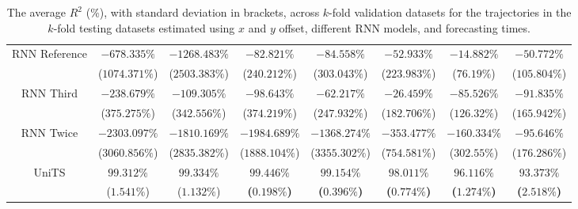 \begin{table}[!ht]
{\begin{tabular}{|c|c|c|c|c|c|c|c|}
			\multirow{2}{*}{RNN Reference} & $-678.335\%$ & $-1268.483\%$ & $-82.821\%$ & $-84.558\%$ & $-52.933\%$ & $-14.882\%$ & $-50.772\%$ \\
			 & ($1074.371\%$) & ($2503.383\%$) & ($240.212\%$) & ($303.043\%$) & ($223.983\%$) & ($76.19\%$) & ($105.804\%$) \\ \hline
			\multirow{2}{*}{RNN Third} & $-238.679\%$ & $-109.305\%$ & $-98.643\%$ & $-62.217\%$ & $-26.459\%$ & $-85.526\%$ & $-91.835\%$ \\
			 & ($375.275\%$) & ($342.556\%$) & ($374.219\%$) & ($247.932\%$) & ($182.706\%$) & ($126.32\%$) & ($165.942\%$) \\ \hline
			\multirow{2}{*}{RNN Twice} & $-2303.097\%$ & $-1810.169\%$ & $-1984.689\%$ & $-1368.274\%$ & $-353.477\%$ & $-160.334\%$ & $-95.646\%$ \\
			 & ($3060.856\%$) & ($2835.382\%$) & ($1888.104\%$) & ($3355.302\%$) & ($754.581\%$) & ($302.55\%$) & ($176.286\%$) \\ \hline
			\multirow{2}{*}{UniTS} & $99.312\%$ & $99.334\%$ & $\mathbf{99.446\%}$ & $\mathbf{99.154\%}$ & $\mathbf{98.011\%}$ & $\mathbf{96.116\%}$ & $\mathbf{93.373\%}$ \\
			 & ($1.541\%$) & ($1.132\%$) & \textbf{(}$\mathbf{0.198\%}$\textbf{)} & \textbf{(}$\mathbf{0.396\%}$\textbf{)} & \textbf{(}$\mathbf{0.774\%}$\textbf{)} & \textbf{(}$\mathbf{1.274\%}$\textbf{)} & \textbf{(}$\mathbf{2.518\%}$\textbf{)} \\ \hline
		\end{tabular}
	}
	\caption{The average $R^{2}$ (\%), with standard deviation in brackets, across $k$-fold validation datasets for the trajectories in the $k$-fold testing datasets estimated using $x$ and $y$ offset, different RNN models, and forecasting times.}
	\label{tab:all_no_abs_R2}
\end{table}

